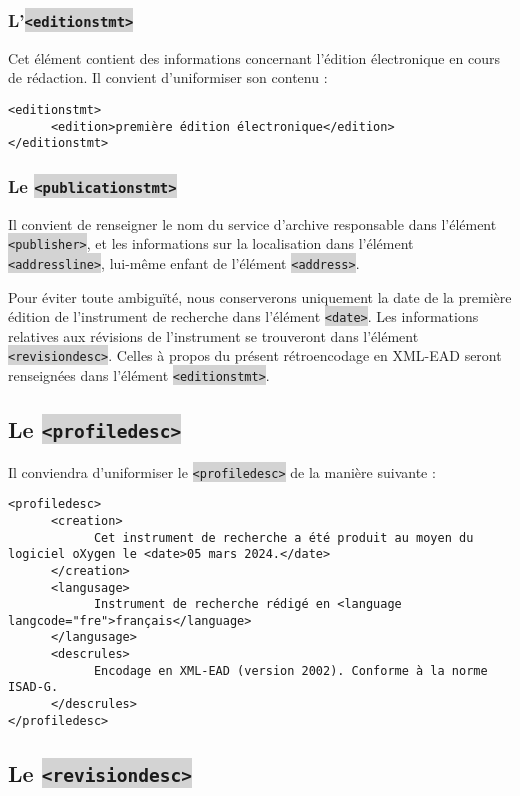 \documentclass[hidelinks, 13pt]{report}
\newcommand{\code}[1]{\colorbox{LightGray}{\texttt{#1}}}
\begin{document}
	\subsubsection{L'\code{<editionstmt>}}

	Cet élément contient des informations concernant l'édition électronique en cours de rédaction. Il convient d'uniformiser son contenu :
	
\begin{lstlisting}[language=EAD]
<editionstmt>
      <edition>première édition électronique</edition>
</editionstmt>
\end{lstlisting}

	\subsubsection{Le \code{<publicationstmt>}}

	Il convient de renseigner le nom du service d'archive responsable dans l'élément \code{<publisher>}, et les informations sur la localisation dans l'élément \code{<addressline>}, lui-même enfant de l'élément \code{<address>}.
	
	Pour éviter toute ambiguïté, nous conserverons uniquement la date de la première édition de l'instrument de recherche dans l'élément \code{<date>}. Les informations relatives aux révisions de l'instrument se trouveront dans l'élément \code{<revisiondesc>}. Celles à propos du présent rétroencodage en XML-EAD seront renseignées dans l'élément \code{<editionstmt>}.
	
	\subsection{Le \code{<profiledesc>}}
	
	Il conviendra d’uniformiser le \code{<profiledesc>} de la manière suivante :

\begin{lstlisting}[language=EAD]
<profiledesc>
      <creation>
            Cet instrument de recherche a été produit au moyen du logiciel oXygen le <date>05 mars 2024.</date>
      </creation>
      <langusage>
            Instrument de recherche rédigé en <language langcode="fre">français</language>
      </langusage>
      <descrules>
            Encodage en XML-EAD (version 2002). Conforme à la norme ISAD-G.
      </descrules>
</profiledesc>
\end{lstlisting}

	\subsection{Le \code{<revisiondesc>}}
	
\end{document}
